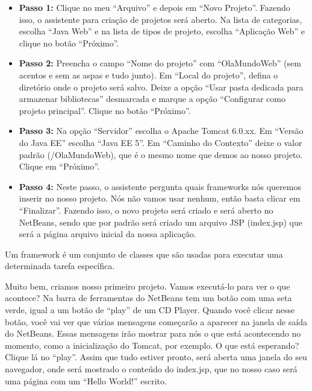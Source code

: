 \begin{itemize}

    \item \textbf{Passo 1:} Clique no meu ``Arquivo'' e depois em ``Novo Projeto''. Fazendo isso, o assistente para criação de projetos será aberto. Na lista de categorias, escolha ``Java Web'' e na lista de tipos de projeto, escolha ``Aplicação Web'' e clique no botão ``Próximo''. 
    
    \item \textbf{Passo 2:} Preencha o campo ``Nome do projeto'' com ``OlaMundoWeb'' (sem acentos e sem as aspas e tudo junto). Em ``Local do projeto'', defina o diretório onde o projeto será salvo. Deixe a opção ``Usar pasta dedicada para armazenar bibliotecas'' desmarcada e marque a opção ``Configurar como projeto principal''. Clique no botão ``Próximo''.
    
    \item \textbf{Passo 3:} Na opção ``Servidor'' escolha o Apache Tomcat 6.0.xx. Em ``Versão do Java EE'' escolha ``Java EE 5''. Em ``Caminho do Contexto'' deixe o valor padrão (/OlaMundoWeb), que é o mesmo nome que demos ao nosso projeto. Clique em ``Próximo''.
    
    \item \textbf{Passo 4:} Neste passo, o assistente pergunta quais frameworks nós queremos inserir no nosso projeto. Nós não vamos usar nenhum, então basta clicar em ``Finalizar''. Fazendo isso, o novo projeto será criado e será aberto no NetBeans, sendo que por padrão será criado um arquivo JSP (index.jsp) que será a página arquivo inicial da nossa aplicação.
    
\end{itemize}

\begin{saibaMais}
    Um framework é um conjunto de classes que são usadas para executar uma determinada tarefa específica.
\end{saibaMais}

Muito bem, criamos nosso primeiro projeto. Vamos executá-lo para ver o que acontece? Na barra de ferramentas do NetBeans tem um botão com uma seta verde, igual a um botão de ``play'' de um CD Player. Quando você clicar nesse botão, você vai ver que várias mensagens começarão a aparecer na janela de saída do NetBeans. Essas mensagens irão mostrar para nós o que está acontecendo no momento, como a inicialização do Tomcat, por exemplo. O que está esperando? Clique lá no ``play''. Assim que tudo estiver pronto, será aberta uma janela do seu navegador, onde será mostrado o conteúdo do index.jsp, que no nosso caso será uma página com um ``Hello World!'' escrito.

